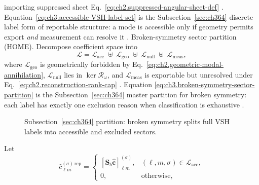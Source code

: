 importing suppressed sheet Eq.~\eqref{eq:ch2.suppressed-angular-sheet-def} \cite{stratton1941}.
Equation~\eqref{eq:ch3.accessible-VSH-label-set} is the Subsection~\ref{sec:ch364} discrete label form of
reportable structure: a mode is accessible only if geometry permits export \emph{and} measurement can resolve it
\cite{harrington2001}.
Broken-symmetry sector partition (HOME). Decompose coefficient space into
\begin{equation}
\label{eq:ch3.broken-symmetry-sector-partition}
\mathcal{L}
=
\mathcal{L}_{\mathrm{acc}}
\;\uplus\;
\mathcal{L}_{\mathrm{geo}}
\;\uplus\;
\mathcal{L}_{\mathrm{null}}
\;\uplus\;
\mathcal{L}_{\mathrm{meas}},
\end{equation}
where \(\mathcal{L}_{\mathrm{geo}}\) is geometrically forbidden by
Eq.~\eqref{eq:ch2.geometric-modal-annihilation}, \(\mathcal{L}_{\mathrm{null}}\) lies in
\(\ker\mathcal{R}_\omega\), and \(\mathcal{L}_{\mathrm{meas}}\) is exportable but unresolved under
Eq.~\eqref{eq:ch2.reconstruction-rank-cap} \cite{harrington2001}. Equation
\eqref{eq:ch3.broken-symmetry-sector-partition} is the Subsection~\ref{sec:ch364} master partition for broken
symmetry: each label has exactly one exclusion reason when classification is exhaustive \cite{harrington2001}.
\begin{figure}[t]
\centering
{}
\caption{Subsection~\ref{sec:ch364} partition: broken symmetry splits full VSH labels into accessible and excluded sectors.}
\label{fig:ch3.364-sector-partition}
\end{figure}
Let
\begin{equation}
\label{eq:ch3.reportable-coefficient-screen}
\widehat{c}_{\ell m}^{(\sigma)\,\mathrm{rep}}
=
\begin{cases}
[\mathbf{S}_{b}\widehat{\mathbf{c}}]_{\ell m}^{(\sigma)}, & (\ell,m,\sigma)\in\mathcal{L}_{\mathrm{acc}},\\
0, & \text{otherwise},
\end{cases}
\end{equation}
